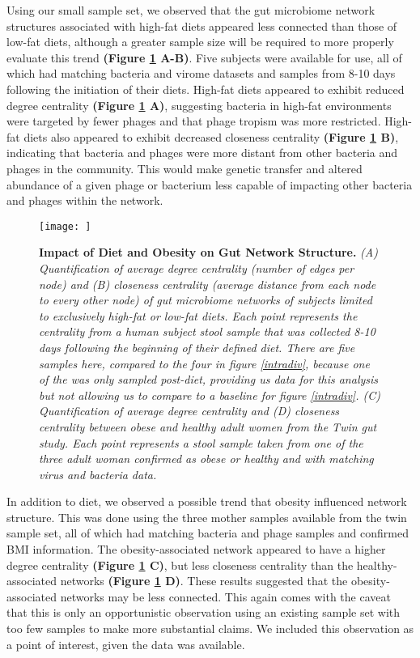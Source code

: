 \documentclass[12pt,]{article}
\begin{document}
Using our small sample set, we observed that the gut microbiome network
structures associated with high-fat diets appeared less connected than
those of low-fat diets, although a greater sample size will be required
to more properly evaluate this trend \textbf{(Figure \ref{dietnetworks}
A-B)}. Five subjects were available for use, all of which had matching
bacteria and virome datasets and samples from 8-10 days following the
initiation of their diets. High-fat diets appeared to exhibit reduced
degree centrality \textbf{(Figure \ref{dietnetworks} A)}, suggesting
bacteria in high-fat environments were targeted by fewer phages and that
phage tropism was more restricted. High-fat diets also appeared to
exhibit decreased closeness centrality \textbf{(Figure
\ref{dietnetworks} B)}, indicating that bacteria and phages were more
distant from other bacteria and phages in the community. This would make
genetic transfer and altered abundance of a given phage or bacterium
less capable of impacting other bacteria and phages within the network.

\begin{figure}[htbp]
\centering
\texttt{[image: ]}
\caption{\textbf{Impact of Diet and Obesity on Gut Network Structure.}
\emph{(A) Quantification of average degree centrality (number of edges
per node) and (B) closeness centrality (average distance from each node
to every other node) of gut microbiome networks of subjects limited to
exclusively high-fat or low-fat diets. Each point represents the
centrality from a human subject stool sample that was collected 8-10
days following the beginning of their defined diet. There are five
samples here, compared to the four in figure \ref{intradiv}, because one
of the was only sampled post-diet, providing us data for this analysis
but not allowing us to compare to a baseline for figure \ref{intradiv}.
(C) Quantification of average degree centrality and (D) closeness
centrality between obese and healthy adult women from the Twin gut
study. Each point represents a stool sample taken from one of the three
adult woman confirmed as obese or healthy and with matching virus and
bacteria data.} \label{dietnetworks}}
\end{figure}

In addition to diet, we observed a possible trend that obesity
influenced network structure. This was done using the three mother
samples available from the twin sample set, all of which had matching
bacteria and phage samples and confirmed BMI information. The
obesity-associated network appeared to have a higher degree centrality
\textbf{(Figure \ref{dietnetworks} C)}, but less closeness centrality
than the healthy-associated networks \textbf{(Figure \ref{dietnetworks}
D)}. These results suggested that the obesity-associated networks may be
less connected. This again comes with the caveat that this is only an
opportunistic observation using an existing sample set with too few
samples to make more substantial claims. We included this observation as
a point of interest, given the data was available.
\end{document}
